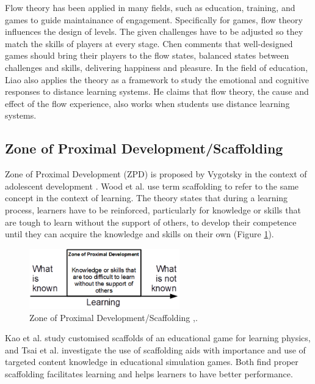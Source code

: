 \documentclass[12pt, a4paper]{report}
\begin{document}
Flow theory has been applied in many fields, such as education, training, and games to guide maintainance of engagement. Specifically for games, flow theory influences the design of levels. The given challenges have to be adjusted so they match the skills of players at every stage. Chen \cite{chen2007flow} comments that well-designed games should bring their players to the flow states, balanced states between challenges and skills, delivering happiness and pleasure. In the field of education, Liao \cite{liao2006flow} also applies the theory as a framework to study the emotional and cognitive responses to distance learning systems. He claims that flow theory, the cause and effect of the flow experience, also works when students use distance learning systems.

\subsection{Zone of Proximal Development/Scaffolding}
Zone of Proximal Development (ZPD) is proposed by Vygotsky in the context of adolescent development \cite{vygotsky1978mind}. Wood et al. \cite{wood1976role} use term scaffolding to refer to the same concept in the context of learning. The theory states that during a learning process, learners have to be reinforced, particularly for knowledge or skills that are tough to learn without the support of others, to develop their competence until they can acquire the knowledge and skills on their own (Figure \ref{scaffolding}). 

\begin{figure}[ht]
\centering
\includegraphics[width=6.5cm]{scaffolding}
\caption{Zone of Proximal Development/Scaffolding \cite{vygotsky1978mind},\cite{wood1976role}.}
\label{scaffolding}
\end{figure}

Kao et al. \cite{kao2015designing} study customised scaffolds of an educational game for learning physics, and Tsai et al. \cite{tsai2013importance} investigate the use of scaffolding aids with importance and use of targeted content knowledge in educational simulation games. Both find proper scaffolding facilitates learning and helps learners to have better performance. 
\end{document}
